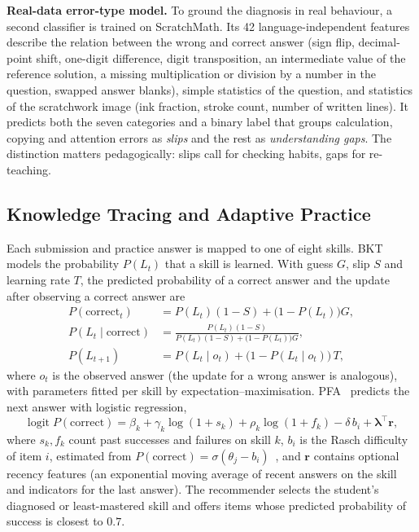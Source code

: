 \documentclass[runningheads]{llncs}
\begin{document}
\textbf{Real-data error-type model.} To ground the diagnosis in real behaviour, a second classifier is trained on ScratchMath. Its 42 language-independent features describe the relation between the wrong and correct answer (sign flip, decimal-point shift, one-digit difference, digit transposition, an intermediate value of the reference solution, a missing multiplication or division by a number in the question, swapped answer blanks), simple statistics of the question, and statistics of the scratchwork image (ink fraction, stroke count, number of written lines). It predicts both the seven categories and a binary label that groups calculation, copying and attention errors as \emph{slips} and the rest as \emph{understanding gaps}. The distinction matters pedagogically: slips call for checking habits, gaps for re-teaching.

\subsection{Knowledge Tracing and Adaptive Practice}

Each submission and practice answer is mapped to one of eight skills. BKT~\cite{corbett1994} models the probability $P(L_t)$ that a skill is learned. With guess $G$, slip $S$ and learning rate $T$, the predicted probability of a correct answer and the update after observing a correct answer are
\begin{align}
P(\text{correct}_t)&=P(L_t)(1-S)+\bigl(1-P(L_t)\bigr)G,\\
P(L_t\mid\text{correct})&=\frac{P(L_t)(1-S)}{P(L_t)(1-S)+\bigl(1-P(L_t)\bigr)G},\\
P(L_{t+1})&=P(L_t\mid o_t)+\bigl(1-P(L_t\mid o_t)\bigr)\,T,
\end{align}
where $o_t$ is the observed answer (the update for a wrong answer is analogous), with parameters fitted per skill by expectation--maximisation. PFA~\cite{pavlik2009} predicts the next answer with logistic regression,
\begin{equation}
\operatorname{logit}P(\text{correct})=\beta_k+\gamma_k\log(1+s_k)+\rho_k\log(1+f_k)-\delta\,b_i+\boldsymbol{\lambda}^{\top}\mathbf{r},
\end{equation}
where $s_k,f_k$ count past successes and failures on skill $k$, $b_i$ is the Rasch difficulty of item $i$, estimated from $P(\text{correct})=\sigma(\theta_j-b_i)$~\cite{rasch1960}, and $\mathbf{r}$ contains optional recency features (an exponential moving average of recent answers on the skill and indicators for the last answer). The recommender selects the student's diagnosed or least-mastered skill and offers items whose predicted probability of success is closest to $0.7$.
\end{document}
